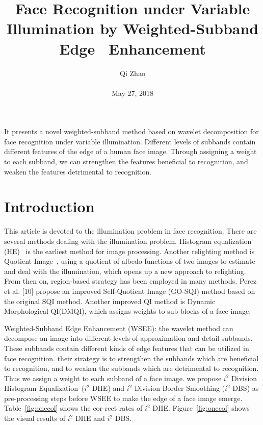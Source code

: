 \documentclass[10pt,twocolumn,letterpaper]{article}
\begin{document}
\title{Face Recognition under Variable Illumination by Weighted-Subband Edge~\cite{Mayyas2005A} Enhancement}
\author{Qi Zhao\\\\May 27, 2018}

\maketitle
It presents a novel weighted-subband method based on wavelet decomposition for face recognition under variable illumination. Different levels of subbands contain different features of the edge of a human face image. Through assigning a weight to each subband, we can strengthen the features beneficial to recognition, and weaken the features detrimental to recognition.
\section{Introduction}
 This article is devoted to the illumination problem in face recognition. There are several methods dealing with the illumination problem. Histogram equalization (HE)~\cite{Pizer1987Adaptive} is the earliest method for image processing. Another relighting method is Quotient Image~\cite{Wang2004Generalized}, using a quotient of albedo functions of two images to estimate and deal with the illumination, which opens up a new approach to relighting. From then on, region-based strategy has been employed in many methods. Perez et al. [10] propose an improved Self-Quotient Image (GO-SQI) method based on the original SQI method. Another improved QI method is Dynamic Morphological QI(DMQI), which assigns weights to sub-blocks of a face image.
\par Weighted-Subband Edge Enhancement (WSEE): the wavelet method can decompose an image into different levels of approximation and detail subbands. These subbands contain different kinds of edge features that can be utilized in face recognition. their strategy is to strengthen the subbands which are beneficial to recognition, and to weaken the subbands which are detrimental to recognition. Thus we assign a weight to each subband of a face image. we propose $i^2$ Division Histogram Equalization~\cite{Chu2013A}($i^2$ DHE) and $i^2$ Division Border Smoothing ($i^2$ DBS) as pre-processing steps before WSEE to make the edge of a face image emerge. Table~\ref{fig:onecol} shows the cor-rect rates of $i^2$ DHE. Figure~\ref{fig:onecol} shows the visual results of $i^2$ DHE and $i^2$ DBS.
\end{document}
